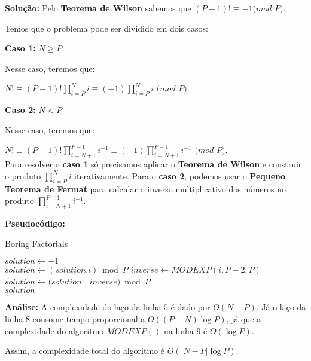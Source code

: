 \textbf{Solução:}
Pelo \textbf{Teorema de Wilson} sabemos que $(P-1)! \equiv -1 (mod$ $P)$. 

Temos que o problema pode ser dividido em dois casos:
\newline

\textbf{Caso 1:} \textit{$N \geq P$}

Nesse caso, teremos que:

$N! \equiv (P-1)!\prod_{i=P}^{N}i \equiv (-1)\prod_{i=P}^{N}i$ $(mod$ $P)$. 
\newline

\textbf{Caso 2:} \textit{$N < P$}

Nesse caso, teremos que:

$N! \equiv (P-1)!\prod_{i=N+1}^{P-1}i^{-1} \equiv (-1)\prod_{i=N+1}^{P-1}i^{-1}$ $(mod$ $P)$. 
\\

Para resolver o \textbf{caso 1} só precisamos aplicar o \textbf{Teorema de Wilson} e construir o produto $\prod_{i=P}^{N}i$ iterativamente.
Para o \textbf{caso 2}, podemos usar o \textbf{Pequeno Teorema de Fermat} para calcular o inverso multiplicativo dos números no produto $\prod_{i=N+1}^{P-1}i^{-1}$. 
\newline 

\textbf{Pseudocódigo:}
\begin{algorithm}
\caption{Boring Factorials}
\begin{algorithmic}[1]
\State $solution \gets -1$
\\
\State $solution \gets (solution.i) \bmod P$
\EndFor
\Else
{}
\State $inverse \gets MODEXP(i, P-2, P)$ 
\State $solution \gets (solution$ . $inverse) \bmod P$
\EndFor
\EndIf
\\
\State \Return $solution$

\EndProcedure
\end{algorithmic}
\end{algorithm}


\textbf{Análise:}
A complexidade do laço da linha $5$ é dado por $O(N-P)$. Já o laço da linha $8$ consome tempo proporcional a $O((P-N)\log P)$, já que
a complexidade do algoritmo $MODEXP()$ na linha $9$ é $O(\log P)$.

Assim, a complexidade total do algoritmo é $O(|N-P|\log P)$.



